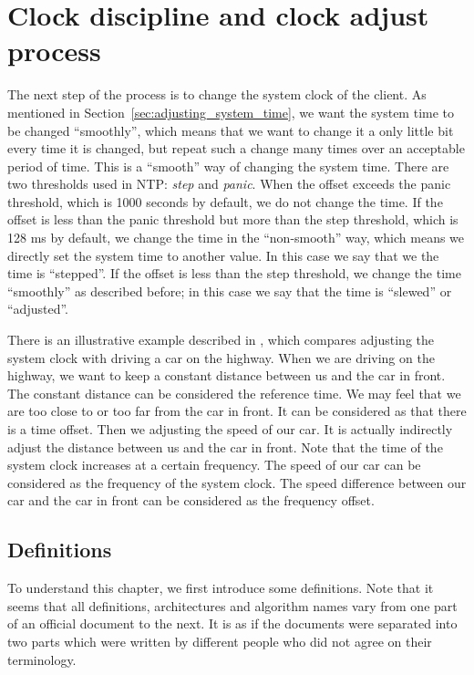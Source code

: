 

\chapter{Clock discipline and clock adjust process}%
\label{cha:clock_discipline_process}
The next step of the process is to change the system clock of the client. As
mentioned in Section~\ref{sec:adjusting_system_time}, we want the system time
to be changed ``smoothly'', which means that we want to change it a only little
bit every time it is changed, but repeat such a change many times over an
acceptable period of time. This is a ``smooth'' way of changing the system
time. There are two thresholds
used in NTP: \emph{step} and \emph{panic}. When the offset exceeds the panic
threshold, which is 1000 seconds by default, we do not change the time. If the
offset is less than the panic threshold but more than the step threshold, which
is 128 ms by default, we change the time in the ``non-smooth'' way, which means
we directly set the system time to another value. In this case we say that
we the time is ``stepped''. If the offset is less than the step threshold, we
change the time ``smoothly'' as described before; in this case we say that the
time is ``slewed'' or ``adjusted''.

There is an illustrative example described in \cite{redbook}, which compares
adjusting the system clock with driving a car on the highway. When we are driving
on the highway, we want to keep a constant distance between us and the car in
front.  The constant distance can be considered the reference time. We may feel
that we are too close to or too far from the car in front. It can be considered
as that there is a time offset. Then we adjusting the speed of our car.  It is
actually indirectly adjust the distance between us and the car in front.  Note
that the time of the system clock increases at a certain frequency. The speed
of our car can be considered as the frequency of the system clock. The speed
difference between our car and the car in front can be considered as the
frequency offset.

\section{Definitions}%
\label{sec:clock_discipline_concepts}
To understand this chapter, we first introduce some definitions.  Note that it
seems that all definitions, architectures and algorithm names vary from one
part of an official document to the next.  It is as if the documents were
separated into two parts which were written by different people who did not
agree on their terminology.

